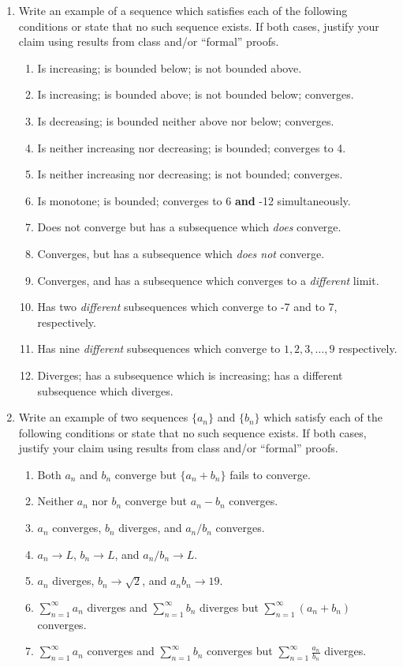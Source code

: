\documentclass[12 pt]{article}
\begin{document}
\begin{enumerate}[leftmargin=0in, rightmargin=-0.25in]
	\item Write an example of a sequence which satisfies each of the following conditions or state that no such sequence exists. If both cases, justify your claim using results from class and/or ``formal'' proofs.
	\begin{enumerate}
		\item Is increasing; is bounded below; is not bounded above. 
		\item Is increasing; is bounded above; is not bounded below; converges.
		\item Is decreasing; is bounded neither above nor below; converges.
		\item Is neither increasing nor decreasing; is bounded; converges to 4.
		\item Is neither increasing nor decreasing; is not bounded; converges.
		\item Is monotone; is bounded; converges to 6 \textbf{and} -12 simultaneously.
		\item Does not converge but has a subsequence which \textit{does} converge.
		\item Converges, but has a subsequence which \textit{does not} converge.
		\item Converges, and has a subsequence which converges to a \textit{different} limit.
		\item Has two \textit{different} subsequences which converge to -7 and to 7, respectively.
		\item Has nine \textit{different} subsequences which converge to $1, 2, 3,\ldots, 9$ respectively.
		\item Diverges; has a subsequence which is increasing; has a different subsequence which diverges.
	\end{enumerate}

	\item Write an example of two sequences $\{a_n\}$ and $\{b_n\}$ which satisfy each of the following conditions or state that no such sequence exists. If both cases, justify your claim using results from class and/or ``formal'' proofs.
	\begin{enumerate}
		\item Both $a_n$ and $b_n$ converge but $\{a_n+b_n\}$ fails to converge.
		\item Neither $a_n$ nor $b_n$ converge but $a_n-b_n$ converges.
		\item $a_n$ converges, $b_n$ diverges, and $a_n/b_n$ converges.
		\item $a_n\to L$, $b_n\to L$, and $a_n/b_n\to L$.
		\item $a_n$ diverges, $b_n\to\sqrt{2}$, and $a_nb_n\to 19$.
		\item $\sum_{n=1}^\infty a_n$ diverges and $\sum_{n=1}^\infty b_n$ diverges but $\sum_{n=1}^\infty (a_n+b_n)$ converges.
		\item $\sum_{n=1}^\infty a_n$ converges and $\sum_{n=1}^\infty b_n$ converges but $\sum_{n=1}^\infty \frac{a_n}{b_n}$ diverges.
	\end{enumerate}
\end{enumerate}
\end{document}
